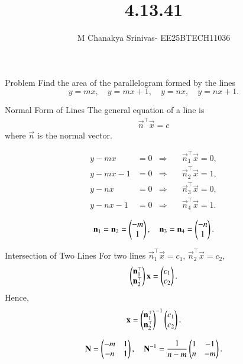\documentclass{beamer}
\title %
{4.13.41}
\date{}
\author %
{M Chanakya Srinivas- EE25BTECH11036}
\begin{document}
\frame{\titlepage}


\begin{frame}{Problem}
Find the area of the parallelogram formed by the lines
\[
y = m x, \quad y = m x + 1, \quad y = n x, \quad y = n x + 1.
\]
\end{frame}

\begin{frame}{Normal Form of Lines}
The general equation of a line is
\begin{align}
\vec{n}^\top\vec{x} = c
\end{align}
where \(\vec{n}\) is the normal vector.

\begin{align}
y - m x &= 0 &\Rightarrow& \quad \vec{n}_1^\top\vec{x} = 0,\\
y - m x - 1 &= 0 &\Rightarrow& \quad \vec{n}_2^\top\vec{x} = 1,\\
y - n x &= 0 &\Rightarrow& \quad \vec{n}_3^\top\vec{x} = 0,\\
y - n x - 1 &= 0 &\Rightarrow& \quad \vec{n}_4^\top\vec{x} = 1.
\end{align}

\begin{align}
\mathbf{n}_1 = \mathbf{n}_2 = \begin{pmatrix}-m \\ 1\end{pmatrix}, \quad 
\mathbf{n}_3 = \mathbf{n}_4 = \begin{pmatrix}-n \\ 1\end{pmatrix}.
\end{align}
\end{frame}

\begin{frame}{Intersection of Two Lines}
For two lines 
\(\vec{n}_1^\top\vec{x} = c_1\), 
\(\vec{n}_2^\top\vec{x} = c_2\),
\begin{align}
\begin{pmatrix}\mathbf{n}_1^\top \\ \mathbf{n}_2^\top\end{pmatrix}\mathbf{x} = \begin{pmatrix}c_1 \\ c_2\end{pmatrix}.
\end{align}
Hence,
\begin{align}
\mathbf{x} = 
\begin{pmatrix}\mathbf{n}_1^\top \\ \mathbf{n}_2^\top\end{pmatrix}^{-1}\begin{pmatrix}c_1 \\ c_2\end{pmatrix}.
\end{align}

\begin{align}
\mathbf{N} = \begin{pmatrix}-m & 1 \\ -n & 1\end{pmatrix}, \quad
\mathbf{N}^{-1} = \frac{1}{n - m}\begin{pmatrix}1 & -1 \\ n & -m\end{pmatrix}.
\end{align}
\end{frame}
\end{document}
